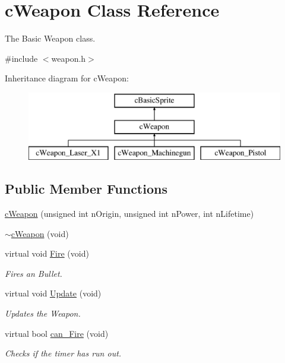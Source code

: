 \hypertarget{classc_weapon}{\section{c\-Weapon Class Reference}
\label{classc_weapon}
}


The Basic Weapon class.  




{\ttfamily \#include $<$weapon.\-h$>$}

Inheritance diagram for c\-Weapon\-:\begin{figure}[H]
\begin{center}
\leavevmode
\includegraphics[height=3.000000cm]{classc_weapon}
\end{center}
\end{figure}
\subsection*{Public Member Functions}
\begin{DoxyCompactItemize}
\item 
\hyperlink{classc_weapon_a7ea6bc99372d9d816b2f84e08e9f705e}{c\-Weapon} (unsigned int n\-Origin, unsigned int n\-Power, int n\-Lifetime)
\item 
\hyperlink{classc_weapon_a9e9bf946457da9aab82a9522a984b5de}{$\sim$c\-Weapon} (void)
\item 
virtual void \hyperlink{classc_weapon_a8c044afb76633d4b110e978923df2518}{Fire} (void)
\begin{DoxyCompactList}\small\item\em Fires an Bullet. \end{DoxyCompactList}\item 
virtual void \hyperlink{classc_weapon_a9b2117eb3f699f86617ffc47dc72e9e4}{Update} (void)
\begin{DoxyCompactList}\small\item\em Updates the Weapon. \end{DoxyCompactList}\item 
virtual bool \hyperlink{classc_weapon_acb85e236a95b5ec661628cdbd032b74a}{can\-\_\-\-Fire} (void)
\begin{DoxyCompactList}\small\item\em Checks if the timer has run out. \end{DoxyCompactList}\end{DoxyCompactItemize}
